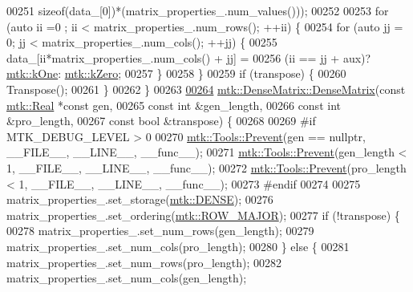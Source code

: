 \begin{DoxyCode}
00251          \textcolor{keyword}{sizeof}(data\_[0])*(matrix\_properties\_.num\_values()));
00252 
00253   \textcolor{keywordflow}{for} (\textcolor{keyword}{auto} ii =0 ; ii < matrix\_properties\_.num\_rows(); ++ii) \{
00254     \textcolor{keywordflow}{for} (\textcolor{keyword}{auto} jj = 0; jj < matrix\_properties\_.num\_cols(); ++jj) \{
00255       data\_[ii*matrix\_properties\_.num\_cols() + jj] =
00256         (ii == jj + aux)? \hyperlink{group__c01-roots_ga26407c24d43b6b95480943340d285c71}{mtk::kOne}: \hyperlink{group__c01-roots_ga59a451a5fae30d59649bcda274fea271}{mtk::kZero};
00257     \}
00258   \}
00259   \textcolor{keywordflow}{if} (transpose) \{
00260     Transpose();
00261   \}
00262 \}
00263 
\hypertarget{mtk__dense__matrix_8cc_source_l00264}{}\hyperlink{classmtk_1_1DenseMatrix_acedaf4058916614d66a18381e624a21d}{00264} \hyperlink{classmtk_1_1DenseMatrix_a0c75ee704707983f935b02835eab0933}{mtk::DenseMatrix::DenseMatrix}(\textcolor{keyword}{const} \hyperlink{group__c01-roots_gac080bbbf5cbb5502c9f00405f894857d}{mtk::Real} *\textcolor{keyword}{const} gen,
00265                               \textcolor{keyword}{const} \textcolor{keywordtype}{int} &gen\_length,
00266                               \textcolor{keyword}{const} \textcolor{keywordtype}{int} &pro\_length,
00267                               \textcolor{keyword}{const} \textcolor{keywordtype}{bool} &transpose) \{
00268 
00269 \textcolor{preprocessor}{  #if MTK\_DEBUG\_LEVEL > 0}
00270   \hyperlink{classmtk_1_1Tools_a332324c6f25e66be9dff48c5987a3b9f}{mtk::Tools::Prevent}(gen == \textcolor{keyword}{nullptr}, \_\_FILE\_\_, \_\_LINE\_\_, \_\_func\_\_);
00271   \hyperlink{classmtk_1_1Tools_a332324c6f25e66be9dff48c5987a3b9f}{mtk::Tools::Prevent}(gen\_length < 1, \_\_FILE\_\_, \_\_LINE\_\_, \_\_func\_\_);
00272   \hyperlink{classmtk_1_1Tools_a332324c6f25e66be9dff48c5987a3b9f}{mtk::Tools::Prevent}(pro\_length < 1, \_\_FILE\_\_, \_\_LINE\_\_, \_\_func\_\_);
00273 \textcolor{preprocessor}{  #endif}
00274 
00275   matrix\_properties\_.set\_storage(\hyperlink{namespacemtk_ga25b67ec6a2afeee69f9bb196a9c66619a00a806d43a7d74e9ccca47a2134e9c87}{mtk::DENSE});
00276   matrix\_properties\_.set\_ordering(\hyperlink{namespacemtk_ga622801bd9f912d0f976c3e383f5f581cabc55178ac16eb1ce89b5f3ab915a91f3}{mtk::ROW\_MAJOR});
00277   \textcolor{keywordflow}{if} (!transpose) \{
00278     matrix\_properties\_.set\_num\_rows(gen\_length);
00279     matrix\_properties\_.set\_num\_cols(pro\_length);
00280   \} \textcolor{keywordflow}{else} \{
00281     matrix\_properties\_.set\_num\_rows(pro\_length);
00282     matrix\_properties\_.set\_num\_cols(gen\_length);

\end{DoxyCode}
